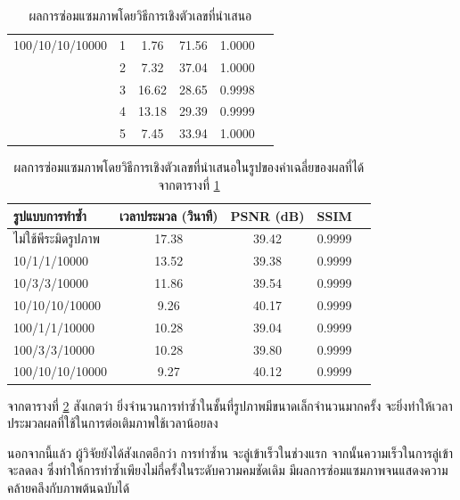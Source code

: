 \documentclass[hidelinks, a4paper,12pt]{article}
\numberwithin{equation}{section}							%
\numberwithin{equation}{section}
\begin{document}
{\begin{table}[H]
\begin{tabular}[ht]{|l|c|c|c|c|c|}
			\hline
			100/10/10/10000  & 1 & 1.76 & 71.56 & 1.0000 \\
			& 2 & 7.32 & 37.04 & 1.0000\\
			& 3 & 16.62 & 28.65 & 0.9998 \\
			& 4 & 13.18 & 29.39 & 0.9999\\
			& 5 & 7.45 & 33.94 & 1.0000 \\
			\hline
		\end{tabular}
		\caption{ผลการซ่อมแซมภาพโดยวิธีการเชิงตัวเลขที่นำเสนอ}
		\label{result:table-multiresolution1}
\end{table}	
	\begin{table}[H]
		\centering
		\begin{tabular}[ht]{|l|c|c|c|c|}
			\hline
			รูปแบบการทำซ้ำ  & เวลาประมวล  (วินาที) & PSNR (dB) & SSIM \\
			\hline
			ไม่ใช้พีระมิดรูปภาพ & 17.38 & 39.42 & 0.9999 \\
			10/1/1/10000 & 13.52 & 39.38 & 0.9999 \\
			10/3/3/10000 & 11.86 & 39.54 & 0.9999 \\
			10/10/10/10000 & 9.26 & 40.17 & 0.9999\\
			100/1/1/10000 & 10.28 & 39.04 & 0.9999\\
			100/3/3/10000 & 10.28 & 39.80 & 0.9999\\
			100/10/10/10000 & 9.27 & 40.12 & 0.9999 \\
			\hline
		\end{tabular}
		\caption{ผลการซ่อมแซมภาพโดยวิธีการเชิงตัวเลขที่นำเสนอในรูปของค่าเฉลี่ยของผลที่ได้จากตารางที่ \ref{result:table-multiresolution1}}
		\label{result:table-multiresolution1-summary}
	\end{table}	
	
	\hspace{1cm}จากตารางที่ \ref{result:table-multiresolution1-summary} สังเกตว่า ยิ่งจำนวนการทำซ้ำในชั้นที่รูปภาพมีขนาดเล็กจำนวนมากครั้ง จะยิ่งทำให้เวลาประมวลผลที่ใช้ในการต่อเติมภาพใช้เวลาน้อยลง
	
	\hspace{1cm} นอกจากนี้แล้ว ผู้วิจัยยังได้สังเกตอีกว่า การทำซ้ำน จะลู่เข้าเร็วในช่วงแรก จากนั้นความเร็วในการลู่เข้าจะลดลง ซึ่งทำให้การทำซ้ำเพียงไม่กี่ครั้งในระดับความคมชัดเดิม  มีผลการซ่อมแซมภาพจนแสดงความคล้ายคลึงกับภาพต้นฉบับได้
	
}
\end{document}
